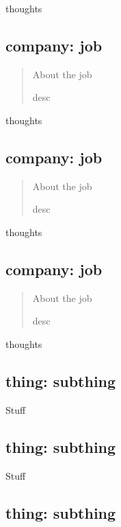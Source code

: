 \documentclass[
	letterpaper, %
	12pt, %
]{CSSullivanBusinessReport}
\begin{document}
thoughts


\subsection[company]{company: job}

\begin{quote}
	About the job
	
	desc

\end{quote}

thoughts


\subsection[company]{company: job}

\begin{quote}
	About the job
	
	desc

\end{quote}

thoughts


\subsection[company]{company: job}

\begin{quote}
	About the job
	
	desc

\end{quote}

thoughts



\subsection[thing]{thing: subthing}

Stuff


\subsection[thing]{thing: subthing}

Stuff


\subsection[thing]{thing: subthing}
\end{document}
